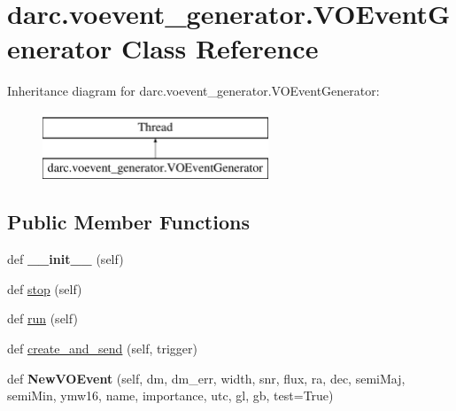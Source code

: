 \hypertarget{classdarc_1_1voevent__generator_1_1_v_o_event_generator}{}\section{darc.\+voevent\+\_\+generator.\+V\+O\+Event\+Generator Class Reference}
\label{classdarc_1_1voevent__generator_1_1_v_o_event_generator}
Inheritance diagram for darc.\+voevent\+\_\+generator.\+V\+O\+Event\+Generator\+:\begin{figure}[H]
\begin{center}
\leavevmode
\includegraphics[height=2.000000cm]{classdarc_1_1voevent__generator_1_1_v_o_event_generator}
\end{center}
\end{figure}
\subsection*{Public Member Functions}
\begin{DoxyCompactItemize}
\item 
\mbox{\label{classdarc_1_1voevent__generator_1_1_v_o_event_generator_ad353435ab52428984149a540a50244ec}} 
def {\bfseries \+\_\+\+\_\+init\+\_\+\+\_\+} (self)
\item 
def \mbox{\hyperlink{classdarc_1_1voevent__generator_1_1_v_o_event_generator_a192b76db66e43572e91d020462afe6ed}{stop}} (self)
\item 
def \mbox{\hyperlink{classdarc_1_1voevent__generator_1_1_v_o_event_generator_af3b4cb052fcca1453a8bc2878d0cf04d}{run}} (self)
\item 
def \mbox{\hyperlink{classdarc_1_1voevent__generator_1_1_v_o_event_generator_a71faea7382ec9a7aaf0a913228383b4c}{create\+\_\+and\+\_\+send}} (self, trigger)
\item 
\mbox{\label{classdarc_1_1voevent__generator_1_1_v_o_event_generator_afd63f7eb5d03ac85ab0ee09efaeaabbc}} 
def {\bfseries New\+V\+O\+Event} (self, dm, dm\+\_\+err, width, snr, flux, ra, dec, semi\+Maj, semi\+Min, ymw16, name, importance, utc, gl, gb, test=True)
\end{DoxyCompactItemize}
